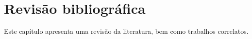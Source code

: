 \chapter{Revisão bibliográfica}
\label{cap:revisao}

Este capítulo apresenta uma revisão da literatura, bem como trabalhos correlatos.
